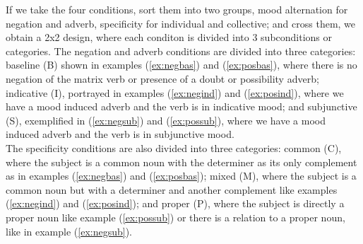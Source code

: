 \begin{exe}
  \label{ex:negbas}
  \label{ex:negind}
 \label{ex:negsub}
\end{exe}

If we take the four conditions, sort them into two groups, mood alternation for negation and adverb, specificity for individual and collective; and cross them, we obtain a 2x2 design, where each conditon is divided into 3 subconditions or categories. The negation and adverb conditions are divided into three categories: baseline (B) shown in examples (\ref{ex:negbas}) and (\ref{ex:posbas}), where there is no negation of the matrix verb or presence of a doubt or possibility adverb; indicative (I), portrayed in examples (\ref{ex:negind}) and (\ref{ex:posind}), where we have a mood induced adverb and the verb is in indicative mood; and subjunctive (S), exemplified in (\ref{ex:negsub}) and (\ref{ex:possub}), where we have a mood induced adverb and the verb is in subjunctive mood.\\ 

The specificity conditions are also divided into three categories: common (C), where the subject is a common noun with the determiner as its only complement as in examples (\ref{ex:negbas}) and (\ref{ex:posbas}); mixed (M), where the subject is a common noun but with a determiner and another complement like examples (\ref{ex:negind}) and (\ref{ex:posind}); and proper (P), where the subject is directly a proper noun like example (\ref{ex:possub}) or there is a relation to a proper noun, like in example (\ref{ex:negsub}).\\

